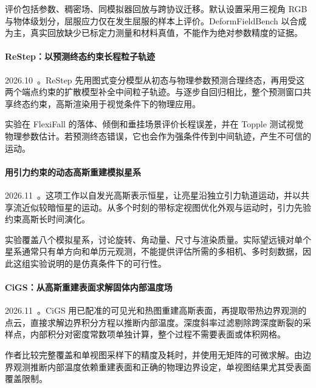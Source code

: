 评价包括参数、稠密场、同模拟器回放与跨协议迁移。默认设置采用三视角 RGB 与物体级划分，屈服应力仅在发生屈服的样本上评价。DeformFieldBench 以合成为主，真实回放缺少已标定力测量和材料真值，不能作为绝对参数精度的证据。

\paragraph{ReStep：以预测终态约束长程粒子轨迹}
2026.10~\cite{2610_18168}。ReStep 先用图式变分模型从初态与物理参数预测合理终态，再用受这两个端点约束的扩散模型补全中间粒子轨迹。与逐步自回归相比，整个预测窗口共享终态约束，高斯渲染用于视觉条件下的物理应用。

实验在 FlexiFall 的落体、倾倒和垂挂场景评价长程误差，并在 Topple 测试视觉物理参数估计。若预测终态错误，它也会作为强条件传到中间轨迹，产生不可信的运动。

\paragraph{用引力约束的动态高斯重建模拟星系}
2026.11~\cite{2611_20089}。这项工作以自发光高斯表示恒星，让亮星沿独立引力轨道运动，并以共享流近似较暗恒星的运动。从多个时刻的带标定视图优化外观与运动时，引力先验约束高斯长时间演化。

实验覆盖八个模拟星系，讨论旋转、角动量、尺寸与渲染质量。实际望远镜对单个星系通常只有单方向和单历元观测，不能提供评估所需的多相机、多时刻数据，因此这组实验说明的是仿真条件下的可行性。

\paragraph{CiGS：从高斯重建表面求解固体内部温度场}
2026.11~\cite{2611_20283}。CiGS 用已配准的可见光和热图重建高斯表面，再提取带热边界观测的点云，直接求解边界积分方程以推断内部温度。深度斜率过滤剔除跨深度断裂的采样点，内部积分对密度常数项单独计算，整个过程不需要表面或体积网格。

作者比较完整覆盖和单视图采样下的精度及耗时，并使用无矩阵的可微求解。由边界观测推断内部温度依赖重建表面和正确的物理边界设定，单视图结果尤其受表面覆盖限制。
